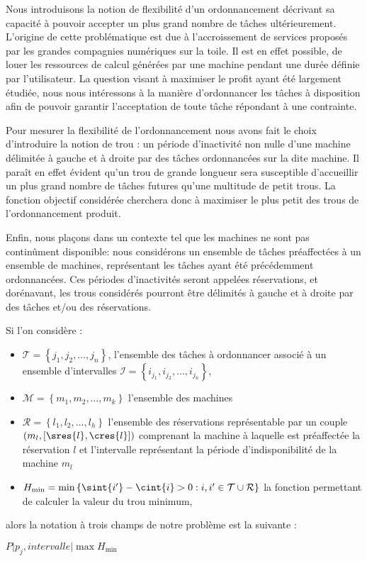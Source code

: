 \documentclass[a4paper,11pt]{report}
\begin{document}
Nous introduisons la notion de flexibilité d'un ordonnancement décrivant
sa capacité à pouvoir accepter un plus grand nombre de tâches ultérieurement. L'origine de cette
problématique est due à l'accroissement de services proposés par les grandes compagnies numériques
sur la toile. Il est en effet possible, de louer les ressources de calcul générées par une machine
pendant une durée définie par l'utilisateur. La question visant à maximiser le profit ayant été
largement étudiée, nous nous intéressons à la manière d'ordonnancer les tâches à disposition afin de
pouvoir garantir l'acceptation de toute tâche répondant à une contrainte. 

Pour mesurer la flexibilité de l'ordonnancement nous avons fait le choix d'introduire la notion de
trou : un période d'inactivité non nulle d'une machine délimitée à gauche et à droite par des tâches
ordonnancées sur la dite machine. Il paraît en effet évident qu'un trou de grande longueur sera
susceptible d'accueillir un plus grand nombre de tâches futures qu'une multitude de petit trous.
La fonction objectif considérée cherchera donc à maximiser le plus petit des trous de
l'ordonnancement produit.

Enfin, nous plaçons dans un contexte tel que les machines ne sont pas continûment disponible: nous
considérons un ensemble de tâches préaffectées à un ensemble de machines, représentant les tâches
ayant été précédemment ordonnancées. Ces périodes d'inactivités
seront appelées réservations, et dorénavant, les trous considérés pourront être délimités à gauche
et à droite par des tâches et/ou des réservations.

Si l'on considère :
\begin{itemize}
    \item $\mathcal{T} = \left\{ j_1, j_2, \dots, j_n \right\}$, l'ensemble des tâches à ordonnancer
        associé à un ensemble d'intervalles $\mathcal{I} = \left\{ i_{j_1}, i_{j_2}, \dots,
        i_{j_n} \right\}$,
    \item $\mathcal{M} = \left\{ m_1, m_2, \dots, m_k \right\}$ l'ensemble des machines 
    \item $\mathcal{R} = \left\{ l_1, l_2, \dots, l_h \right\}$ l'ensemble des réservations
        représentable par un couple $\left( m_l, \left[ \sres{l}, \cres{l} \right] \right)$
        comprenant la machine à laquelle est préaffectée la réservation $l$ et l'intervalle
        représentant la période d'indisponibilité de la machine $m_l$
    \item $H_{\min} = \min \left\{ \sint{i'} - \cint{i} > 0 : i, i' \in \mathcal{T} \cup
        \mathcal{R} \right\}$ la fonction permettant de calculer la valeur du trou minimum,
\end{itemize}
alors la notation à trois champs de notre problème est la suivante :
\begin{center}
    $P \Big| p_j, intervalle \Big| \max H_{\min}$
\end{center}
\end{document}
